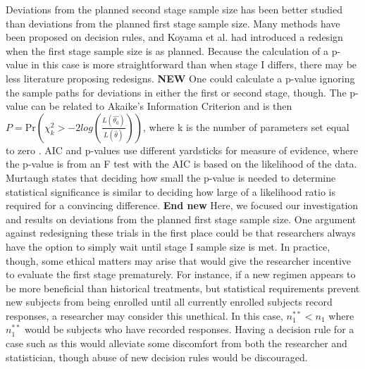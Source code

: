 \documentclass[12pt]{report}\usepackage[]{graphicx}\usepackage[]{color}
\newlength{\li}\setlength{\li}{14.48pt}
\newlength{\di}\setlength{\di}{-3.5mm}
\begin{document}
Deviations from the planned second stage sample size has been better studied than deviations from the planned first stage sample size. Many methods have been proposed on decision rules, and Koyama et al. had introduced a redesign when the first stage sample size is as planned. Because the calculation of a p-value in this case is more straightforward than when stage I differs, there may be less literature proposing redesigns. \textbf{NEW} One could calculate a p-value ignoring the sample paths for deviations in either the first or second stage, though. The p-value can be related to Akaike's Information Criterion and is then $P = \mbox{Pr}\left(\chi^2_k > -2 log\left(\frac{L(\hat{\theta_0})}{L(\hat{\theta})}\right)\right)$, where k is the number of parameters set equal to zero \cite{Paul}. AIC and p-values use different yardsticks for measure of evidence, where the p-value is from an F test with the AIC is based on the likelihood of the data. Murtaugh \cite{Paul} states that deciding how small the p-value is needed to determine statistical significance is similar to deciding how large of a likelihood ratio is required for a convincing difference. \textbf{End new} Here, we focused our investigation and results on deviations from the planned first stage sample size. One argument against redesigning these trials in the first place could be that researchers always have the option to simply wait until stage I sample size is met. In practice, though, some ethical matters may arise that would give the researcher incentive to evaluate the first stage prematurely. For instance, if a new regimen appears to be more beneficial than historical treatments, but statistical requirements prevent new subjects from being enrolled until all currently enrolled subjects record responses, a researcher may consider this unethical. In this case, $n_1^{\ast\ast} < n_1$ where $n_1^{\ast\ast}$ would be subjects who have recorded responses. Having a decision rule for a case such as this would alleviate some discomfort from both the researcher and statistician, though abuse of new decision rules would be discouraged. \\
\end{document}
